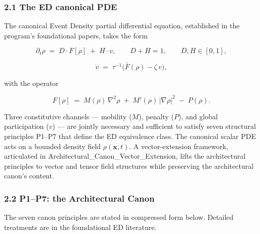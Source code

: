 \documentclass[
  11pt,a4paper]{article}
\begin{document}
\subsubsection{2.1 The ED canonical PDE}\label{the-ed-canonical-pde}

The canonical Event Density partial differential equation, established
in the program's foundational papers, takes the form

\[\partial_t \rho \;=\; D \cdot F[\rho] \;+\; H \cdot v, \qquad D + H = 1, \qquad D, H \in [0, 1],\]

\[\dot v \;=\; \tau^{-1}\bigl(\bar F(\rho) - \zeta\, v\bigr),\]

with the operator

\[F[\rho] \;=\; M(\rho)\,\nabla^2 \rho \;+\; M'(\rho)\,|\nabla\rho|^2 \;-\; P(\rho).\]

Three constitutive channels --- mobility (\(M\)), penalty (\(P\)), and
global participation (\(v\)) --- are jointly necessary and sufficient to
satisfy seven structural principles P1--P7 that define the ED
equivalence class. The canonical scalar PDE acts on a bounded density
field \(\rho(\mathbf{x}, t)\). A vector-extension framework, articulated
in Architectural\_Canon\_Vector\_Extension, lifts the architectural
principles to vector and tensor field structures while preserving the
architectural canon's content.

\subsubsection{2.2 P1--P7: the Architectural
Canon}\label{p1p7-the-architectural-canon}

The seven canon principles are stated in compressed form below. Detailed
treatments are in the foundational ED literature.
\end{document}
